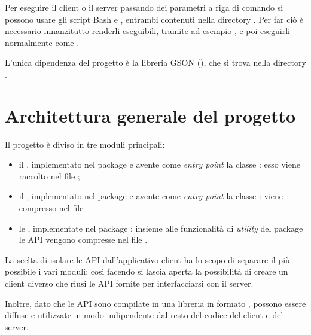 \documentclass[
    oneside,
    10pt,
    language=italian,
    a4paper,
    article
]{notes}
\begin{document}
Per eseguire il client o il server passando dei parametri a riga di comando si
possono usare gli script Bash  e ,
entrambi contenuti nella directory . Per far ciò è necessario
innanzitutto renderli eseguibili, tramite ad esempio 
, e poi eseguirli
normalmente come .

L'unica dipendenza del progetto è la libreria GSON (),
che si trova nella directory .

\section{Architettura generale del progetto} \label{sec:arch}
Il progetto è diviso in tre moduli principali: \begin{itemize}
    \item il , implementato nel package 
        e avente come \emph{entry point} la classe 
        : esso viene raccolto
        nel file ;
    \item il , implementato nel package 
        e avente come \emph{entry point} la classe
        : viene compresso nel
        file 
    \item le , implementate nel package :
        insieme alle funzionalità di \emph{utility} del package 
         le API vengono compresse nel file
        .
\end{itemize}

La scelta di isolare le API dall'applicativo client ha lo scopo di separare il
più possibile i vari moduli: così facendo si lascia aperta la possibilità
di creare un client diverso che riusi le API fornite per interfacciarsi con
il server.

Inoltre, dato che le API sono compilate in una libreria in formato ,
possono essere diffuse e utilizzate in modo indipendente dal resto del codice
del client e del server. 
\end{document}
